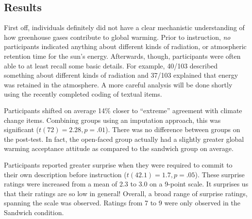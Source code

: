 \subsection{Results}

First off, individuals definitely did not have a clear mechanistic understanding
of how greenhouse gases contribute to global warming. Prior to instruction,
\emph{no} participants indicated anything about different kinds of radiation, or
atmospheric retention time for the sun's energy. Afterwards, though,
participants were often able to at least recall some basic details. For example,
40/103 described something about different kinds of radiation and 37/103
explained that energy was retained in the atmosphere. A more careful analysis
will be done shortly using the recently completed coding of textual items.

Participants shifted on average 14\% closer to ``extreme'' agreement with climate
change items. Combining groups using an imputation approach, this was
significant ($t(72)=2.28, p=.01$). There was no difference between groups on the post-test. In fact, the open-faced
group actually had a slightly greater global warming acceptance
attitude as compared to the sandwich group on average. 

Participants reported greater surprise when they were required to commit to
their own description before instruction ($t(42.1)=1.7, p=.05$). These surprise
ratings were increased from a mean of 2.3 to 3.0 on a 9-point scale. It
surprises us that their ratings are so low in general! Overall, a broad range of
surprise ratings, spanning the scale was observed. Ratings from 7 to 9 were only
observed in the Sandwich condition.

